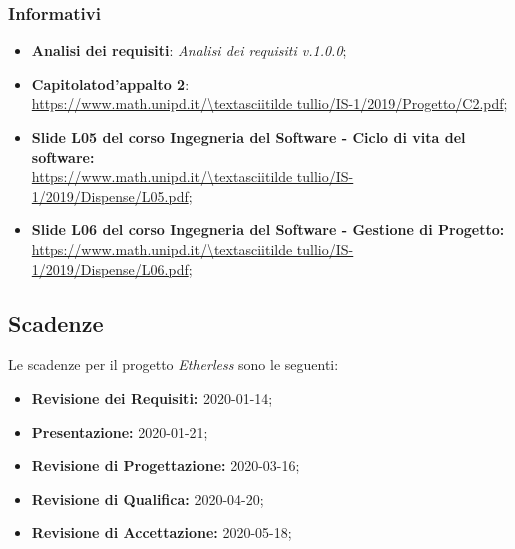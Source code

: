 \subsubsection{Informativi}
\begin{itemize}
	\item \textbf{Analisi dei requisiti}: \textit{Analisi dei requisiti v.1.0.0}\docs;
    \item \textbf{Capitolato\glo d'appalto 2}:\\ 
			\url{https://www.math.unipd.it/\textasciitilde tullio/IS-1/2019/Progetto/C2.pdf};
	\item \textbf{Slide L05 del corso Ingegneria del Software - Ciclo di vita del software:} \\
			\url{https://www.math.unipd.it/\textasciitilde tullio/IS-1/2019/Dispense/L05.pdf};
	\item \textbf{Slide L06 del corso Ingegneria del Software - Gestione di Progetto:} \\
			\url{https://www.math.unipd.it/\textasciitilde tullio/IS-1/2019/Dispense/L06.pdf};
\end{itemize}
\subsection{Scadenze}
Le scadenze per il progetto \textit{Etherless} sono le seguenti:
\begin{itemize}
	\item \textbf{Revisione dei Requisiti:} 2020-01-14;
	\item \textbf{Presentazione:} 2020-01-21;
	\item \textbf{Revisione di Progettazione:} 2020-03-16;
	\item \textbf{Revisione di Qualifica:} 2020-04-20;
	\item \textbf{Revisione di Accettazione:} 2020-05-18;
\end{itemize}

	
	
	